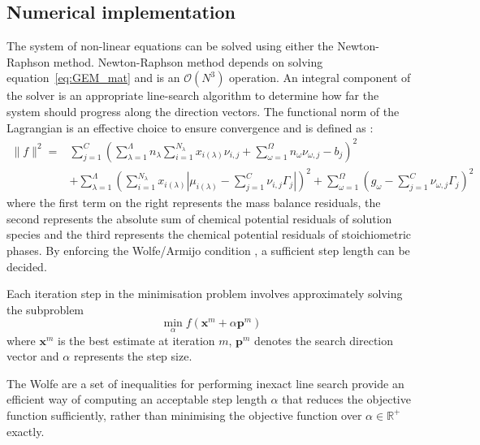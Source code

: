 	\subsection{Numerical implementation}
	The system of non-linear equations can be solved using either the Newton-Raphson method. Newton-Raphson method depends on solving  equation~\eqref{eq:GEM_mat} and is an $\mathcal{O}(N^3)$ operation.	
	An integral component of the solver is an appropriate line-search algorithm to determine how far the system should progress along the direction vectors. The functional norm of the Lagrangian is an effective choice to ensure convergence and is defined as \cite{Piro17}:
	\begin{equation}
	\begin{aligned}
		\|f\|^2 = &\sum_{j=1}^{C}\left(\sum_{\lambda=1}^{\Lambda} n_\lambda \sum_{i=1}^{N_\lambda} x_{i(\lambda)}\nu_{i,j} + \sum_{\omega=1}^{\Omega}n_{\omega}\nu_{\omega,j} - b_j\right)^2 \\
		&+ \sum_{\lambda=1}^{\Lambda} \left(\sum_{i=1}^{N_\lambda} x_{i(\lambda)}\left\vert\mu_{i(\lambda)} - \sum_{j=1}^{C}\nu_{i,j} \Gamma_j \right\vert \right)^2 + \sum_{\omega=1}^{\Omega}\left(g_\omega - \sum_{j=1}^{C}\nu_{\omega,j} \Gamma_j \right)^2
		\end{aligned}
	\end{equation}
	where the first term on the right represents the mass balance residuals, the second represents the absolute sum of chemical potential residuals of solution species and the third represents the chemical potential residuals of stoichiometric phases. By enforcing the Wolfe/Armijo condition \cite{Nocedal06}, a sufficient step length can be decided.
	
	Each iteration step in the minimisation problem involves approximately solving the subproblem 
	\begin{equation}
		\min_\alpha f\left(\mathbf{x}^m + \alpha \mathbf{p}^m\right)
	\end{equation}
	where $\mathbf{x}^m$ is the best estimate at iteration $m$, $\mathbf{p}^m$ denotes the search direction vector and $\alpha$ represents the step size. 
	
	The Wolfe are a set of inequalities for performing inexact line search provide an efficient way of computing an acceptable step length $\alpha$  that reduces the objective function sufficiently, rather than minimising the objective function over $\alpha \in \mathbb {R}^{+}$ exactly.
	
